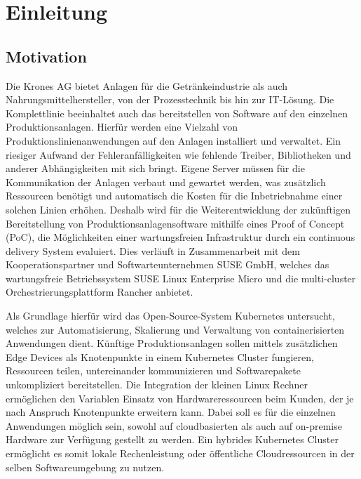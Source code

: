 \chapter{Einleitung}
\section{Motivation}
Die Krones AG bietet Anlagen für die Getränkeindustrie als auch 
Nahrungsmittelhersteller, von der Prozesstechnik bis hin zur IT-Lösung. 
Die Komplettlinie beeinhaltet auch das bereitstellen von Software auf den einzelnen Produktionsanlagen. 
Hierfür werden eine Vielzahl von Produktionslinienanwendungen auf den Anlagen installiert und verwaltet.
Ein riesiger Aufwand der Fehleranfälligkeiten wie fehlende Treiber, Bibliotheken
und anderer Abhängigkeiten mit sich bringt.
Eigene Server müssen für die Kommunikation der Anlagen verbaut und gewartet werden,
was zusätzlich Ressourcen benötigt und automatisch die Kosten für die Inbetriebnahme einer solchen
Linien erhöhen.
Deshalb wird für die Weiterentwicklung der zukünftigen Bereitstellung von Produktionsanlagensoftware
mithilfe eines Proof of Concept (PoC), die Möglichkeiten einer wartungsfreien Infrastruktur
durch ein continuous delivery System evaluiert. Dies verläuft in Zusammenarbeit mit dem
Kooperationspartner und Softwarteunternehmen SUSE GmbH, welches das wartungsfreie Betriebssystem
SUSE Linux Enterprise Micro und die multi-cluster Orchestrierungsplattform Rancher anbietet.

Als Grundlage hierfür wird das Open-Source-System Kubernetes untersucht, welches zur Automatisierung, Skalierung
und Verwaltung von containerisierten Anwendungen dient. Künftige Produktionsanlagen sollen mittels zusätzlichen Edge Devices
als Knotenpunkte in einem Kubernetes Cluster fungieren, Ressourcen teilen, untereinander kommunizieren und Softwarepakete unkompliziert bereitstellen.
Die Integration der kleinen Linux Rechner ermöglichen den Variablen Einsatz von Hardwareressourcen beim Kunden, der je nach Anspruch Knotenpunkte erweitern kann.
Dabei soll es für die einzelnen Anwendungen möglich sein, sowohl auf cloudbasierten als auch auf on-premise Hardware zur Verfügung gestellt zu werden.
Ein hybrides Kubernetes Cluster ermöglicht es somit lokale Rechenleistung oder öffentliche Cloudressourcen in der selben Softwareumgebung zu nutzen.

